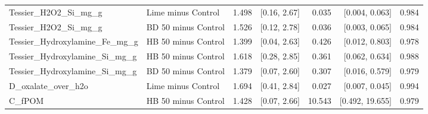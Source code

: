 \documentclass[preprint,12pt]{elsarticle}
\begin{document}
\begin{landscape}
\begin{longtable}{@{} >{\raggedright\arraybackslash}p{4.4cm} >{\raggedright\arraybackslash}p{4.0cm} r r r r r @{} }
Tessier\_\allowbreak{}H2O2\_\allowbreak{}Si\_\allowbreak{}mg\_\allowbreak{}g & Lime minus Control & 1.498 & [0.16, 2.67] & 0.035 & [0.004, 0.063] & 0.984 \\
Tessier\_\allowbreak{}H2O2\_\allowbreak{}Si\_\allowbreak{}mg\_\allowbreak{}g & BD 50 minus Control & 1.526 & [0.12, 2.78] & 0.036 & [0.003, 0.065] & 0.984 \\
Tessier\_\allowbreak{}Hydroxylamine\_\allowbreak{}Fe\_\allowbreak{}mg\_\allowbreak{}g & HB 50 minus Control & 1.399 & [0.04, 2.63] & 0.426 & [0.012, 0.803] & 0.978 \\
Tessier\_\allowbreak{}Hydroxylamine\_\allowbreak{}Si\_\allowbreak{}mg\_\allowbreak{}g & HB 50 minus Control & 1.618 & [0.28, 2.85] & 0.361 & [0.062, 0.634] & 0.988 \\
Tessier\_\allowbreak{}Hydroxylamine\_\allowbreak{}Si\_\allowbreak{}mg\_\allowbreak{}g & BD 50 minus Control & 1.379 & [0.07, 2.60] & 0.307 & [0.016, 0.579] & 0.979 \\
D\_\allowbreak{}oxalate\_\allowbreak{}over\_\allowbreak{}h2o & Lime minus Control & 1.694 & [0.41, 2.84] & 0.027 & [0.007, 0.045] & 0.994 \\
C\_\allowbreak{}fPOM & HB 50 minus Control & 1.428 & [0.07, 2.66] & 10.543 & [0.492, 19.655] & 0.979 \\
\end{longtable}

\newpage


\end{landscape}
\end{document}
